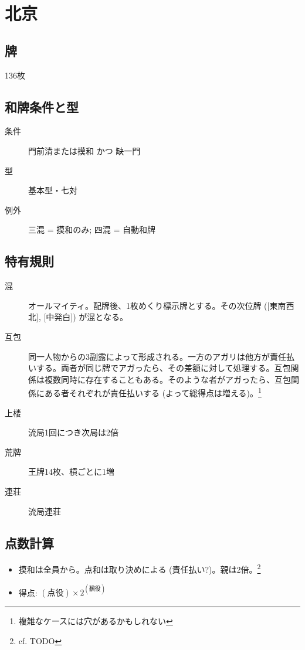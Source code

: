 \documentclass{ltjsarticle}
\begin{document}
\section{北京}
\subsection{牌}136枚
\subsection{和牌条件と型}
\begin{description}
    \item[条件] 門前清または摸和 かつ 缺一門
    \item[型] 基本型・七対
    \item[例外] 三混 = 摸和のみ; 四混 = 自動和牌
\end{description}
\subsection{特有規則}
\begin{description}
    \item[混] オールマイティ。配牌後、1枚めくり標示牌とする。その次位牌 ([東南西北], [中発白]) が混となる。
    \item[互包] 同一人物からの3副露によって形成される。一方のアガリは他方が責任払いする。両者が同じ牌でアガったら、その差額に対して処理する。互包関係は複数同時に存在することもある。そのような者がアガったら、互包関係にある者それぞれが責任払いする (よって総得点は増える)。\footnote{複雑なケースには穴があるかもしれない}
    \item[上楼] 流局1回につき次局は2倍
    \item[荒牌] 王牌14枚、槓ごとに1増
    \item[連荘] 流局連荘
\end{description}
\subsection{点数計算}
\begin{itemize}
    \item 摸和は全員から。点和は取り決めによる (責任払い?)。親は2倍。\footnote{cf. TODO}
    \item 得点: $(\text{点役})\times2^{(\text{飜役})}$
\end{itemize}
\end{document}
